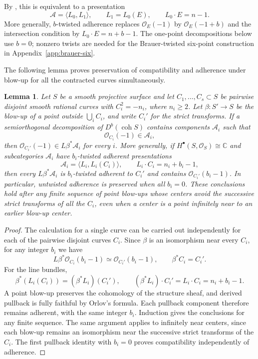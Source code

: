 \documentclass[11pt]{article}
\theoremstyle{plain}
\newtheorem{lemma}[lemma]{Lemma}
\theoremstyle{definition}
\theoremstyle{remark}
\newcommand{\C}{\mathbb C}
\newcommand{\Db}{D^b}
\newcommand{\coh}{\operatorname{coh}}
\newcommand{\OO}{\mathcal O}
\begin{document}
By \cite[Lemma~3.5, Definition~3.6, and Example~3.7]{KKS2020}, this is
equivalent to a presentation
\[
\mathcal A=\langle L_0,L_1\rangle,
\qquad
L_1=L_0(E),
\qquad
L_0\cdot E=n-1.
\]
More generally, \(b\)-twisted adherence replaces \(\OO_E(-1)\) by
\(\OO_E(-1+b)\) and the intersection condition by
\(L_0\cdot E=n+b-1\). The one-point decompositions below use \(b=0\);
nonzero twists are needed for the Brauer-twisted six-point construction
in Appendix~\ref{app:brauer-six}.

The following lemma proves preservation of compatibility and adherence
under blow-up for all the contracted curves simultaneously.

\begin{lemma}
\label{lem:kks-blowups}
Let \(S\) be a smooth projective surface and let
\(C_1,\ldots,C_s\subset S\) be pairwise disjoint smooth rational
curves with \(C_i^2=-n_i\), where \(n_i\geq2\). Let
\(\beta:S'\to S\) be the blow-up of a point outside
\(\bigcup_i C_i\), and write \(C_i'\) for the strict transforms.
If a semiorthogonal decomposition of \(\Db(\coh S)\) contains
components \(\mathcal A_i\) such that
\[
\OO_{C_i}(-1)\in\mathcal A_i,
\]
then \(\OO_{C_i'}(-1)\in L\beta^*\mathcal A_i\) for every \(i\).
More generally, if \(H^\bullet(S,\OO_S)\cong\C\) and subcategories
\(\mathcal A_i\) have \(b_i\)-twisted adherent presentations
\[
\mathcal A_i=\langle L_i,L_i(C_i)\rangle,
\qquad L_i\cdot C_i=n_i+b_i-1,
\]
then every \(L\beta^*\mathcal A_i\) is \(b_i\)-twisted adherent to
\(C_i'\) and contains \(\OO_{C_i'}(b_i-1)\).
In particular, untwisted adherence is preserved when all \(b_i=0\).
These conclusions hold after any finite sequence of point blow-ups
whose centers avoid the successive strict transforms of all the
\(C_i\), even when a center is a point infinitely near to an earlier
blow-up center.
\end{lemma}

\begin{proof}
The calculation for a single curve can be carried out independently for
each of the pairwise disjoint curves \(C_i\). Since \(\beta\) is an
isomorphism near every \(C_i\), for any integer \(b_i\) we have
\[
L\beta^*\OO_{C_i}(b_i-1)\simeq\OO_{C_i'}(b_i-1),
\qquad
\beta^*C_i=C_i'.
\]
For the line bundles,
\[
\beta^*(L_i(C_i))=(\beta^*L_i)(C_i'),
\qquad
(\beta^*L_i)\cdot C_i'=L_i\cdot C_i=n_i+b_i-1.
\]
A point blow-up preserves the cohomology of the structure sheaf, and
derived pullback is fully faithful by Orlov's formula. Each pullback
component therefore remains adherent, with the same integer \(b_i\).
Induction gives the conclusions for any finite sequence. The same argument
applies to infinitely near centers, since each blow-up remains an
isomorphism near the successive strict transforms of the \(C_i\).
The first pullback identity with \(b_i=0\) proves compatibility
independently of adherence.
\end{proof}
\end{document}
